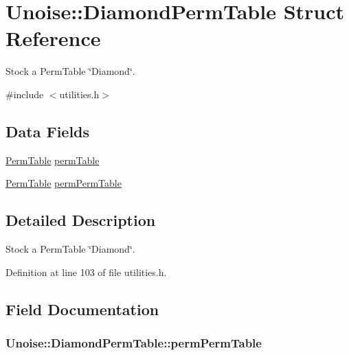 \hypertarget{struct_unoise_1_1_diamond_perm_table}{\section{Unoise\-:\-:Diamond\-Perm\-Table Struct Reference}
\label{struct_unoise_1_1_diamond_perm_table}
}


Stock a Perm\-Table \char`\"{}\-Diamond\char`\"{}.  




{\ttfamily \#include $<$utilities.\-h$>$}

\subsection*{Data Fields}
\begin{DoxyCompactItemize}
\item 
\hyperlink{namespace_unoise_ae11142038f2dd1bea2711b2b99bbfaf6}{Perm\-Table} \hyperlink{struct_unoise_1_1_diamond_perm_table_abbdd2c631912b46dd642a1742fafc2cc}{perm\-Table}
\item 
\hyperlink{namespace_unoise_ae11142038f2dd1bea2711b2b99bbfaf6}{Perm\-Table} \hyperlink{struct_unoise_1_1_diamond_perm_table_a5445920a0bda0d71a2523175fb125df4}{perm\-Perm\-Table}
\end{DoxyCompactItemize}


\subsection{Detailed Description}
Stock a Perm\-Table \char`\"{}\-Diamond\char`\"{}. 

Definition at line 103 of file utilities.\-h.



\subsection{Field Documentation}
\hypertarget{struct_unoise_1_1_diamond_perm_table_a5445920a0bda0d71a2523175fb125df4}{
\subsubsection[{perm\-Perm\-Table}]{ Unoise\-::\-Diamond\-Perm\-Table\-::perm\-Perm\-Table}}\label{struct_unoise_1_1_diamond_perm_table_a5445920a0bda0d71a2523175fb125df4}


